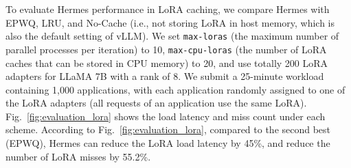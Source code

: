 To evaluate Hermes performance in LoRA caching, we compare Hermes with EPWQ, LRU, and No-Cache (i.e., not storing LoRA in host memory, which is also the default setting of vLLM). 
We set \texttt{max-loras} (the maximum number of parallel processes per iteration) to 10, \texttt{max-cpu-loras} (the number of LoRA caches that can be stored in CPU memory) to 20, and use totally 200 LoRA adapters for LLaMA 7B with a rank of 8. 
We submit a 25-minute workload containing 1,000 applications, with each application randomly assigned to one of the LoRA adapters (all requests of an application use the same LoRA).
Fig.~\ref{fig:evaluation_lora} shows the load latency and miss count under each scheme.
According to Fig.~\ref{fig:evaluation_lora}, compared to the second best (EPWQ), Hermes can reduce the LoRA load latency by 45\%, and reduce the number of LoRA misses by 55.2\%.



